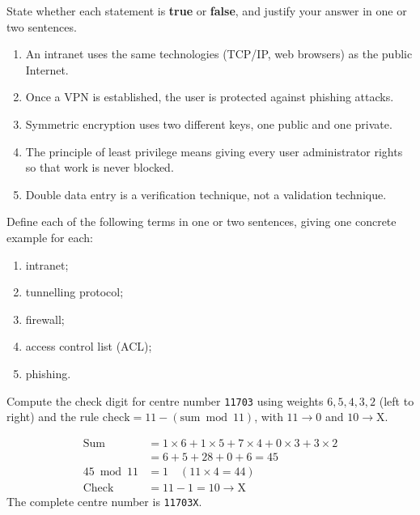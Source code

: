 \documentclass[11pt]{article}
\begin{document}
\begin{exercice}
State whether each statement is \textbf{true} or \textbf{false}, and justify your answer in one or two sentences.
\begin{enumerate}
\item An intranet uses the same technologies (TCP/IP, web browsers) as the public Internet.
\item Once a VPN is established, the user is protected against phishing attacks.
\item Symmetric encryption uses two different keys, one public and one private.
\item The principle of least privilege means giving every user administrator rights so that work is never blocked.
\item Double data entry is a verification technique, not a validation technique.
\end{enumerate}
\end{exercice}

\begin{exercice}
Define each of the following terms in one or two sentences, giving one concrete example for each:
\begin{enumerate}
\item intranet;
\item tunnelling protocol;
\item firewall;
\item access control list (ACL);
\item phishing.
\end{enumerate}
\end{exercice}

\begin{exemplebox}
Compute the check digit for centre number \texttt{11703} using weights $6,5,4,3,2$ (left to right) and the rule  
$\text{check} = 11 - (\text{sum} \bmod 11)$, with $11 \to 0$ and $10 \to \text{X}$.

\begin{align*}
\text{Sum} &= 1\times6 + 1\times5 + 7\times4 + 0\times3 + 3\times2 \\
          &= 6 + 5 + 28 + 0 + 6 = 45 \\
45 \bmod 11 &= 1 \quad (11\times4 = 44) \\
\text{Check} &= 11 - 1 = 10 \to \text{X}
\end{align*}
The complete centre number is \texttt{11703X}.
\end{exemplebox}
\end{document}
